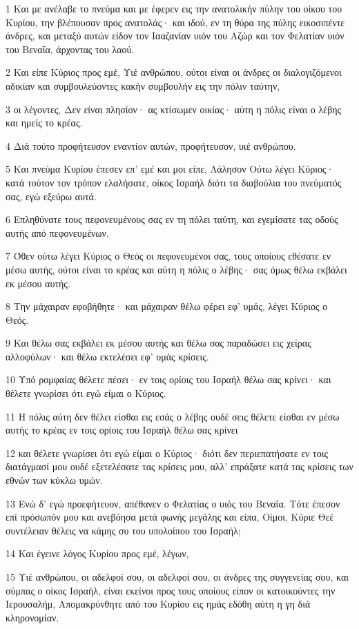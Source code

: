 \par 1 Και με ανέλαβε το πνεύμα και με έφερεν εις την ανατολικήν πύλην του οίκου του Κυρίου, την βλέπουσαν προς ανατολάς· και ιδού, εν τη θύρα της πύλης εικοσιπέντε άνδρες, και μεταξύ αυτών είδον τον Ιααζανίαν υιόν του Αζώρ και τον Φελατίαν υιόν του Βεναΐα, άρχοντας του λαού.
\par 2 Και είπε Κύριος προς εμέ, Υιέ ανθρώπου, ούτοι είναι οι άνδρες οι διαλογιζόμενοι αδικίαν και συμβουλεύοντες κακήν συμβουλήν εις την πόλιν ταύτην,
\par 3 οι λέγοντες, Δεν είναι πλησίον· ας κτίσωμεν οικίας· αύτη η πόλις είναι ο λέβης και ημείς το κρέας.
\par 4 Διά τούτο προφήτευσον εναντίον αυτών, προφήτευσον, υιέ ανθρώπου.
\par 5 Και πνεύμα Κυρίου έπεσεν επ' εμέ και μοι είπε, Λάλησον Ούτω λέγει Κύριος· κατά τούτον τον τρόπον ελαλήσατε, οίκος Ισραήλ διότι τα διαβούλια του πνεύματός σας, εγώ εξεύρω αυτά.
\par 6 Επληθύνατε τους πεφονευμένους σας εν τη πόλει ταύτη, και εγεμίσατε τας οδούς αυτής από πεφονευμένων.
\par 7 Όθεν ούτω λέγει Κύριος ο Θεός οι πεφονευμένοι σας, τους οποίους εθέσατε εν μέσω αυτής, ούτοι είναι το κρέας και αύτη η πόλις ο λέβης· σας όμως θέλω εκβάλει εκ μέσου αυτής.
\par 8 Την μάχαιραν εφοβήθητε· και μάχαιραν θέλω φέρει εφ' υμάς, λέγει Κύριος ο Θεός.
\par 9 Και θέλω σας εκβάλει εκ μέσου αυτής και θέλω σας παραδώσει εις χείρας αλλοφύλων· και θέλω εκτελέσει εφ' υμάς κρίσεις.
\par 10 Υπό ρομφαίας θέλετε πέσει· εν τοις ορίοις του Ισραήλ θέλω σας κρίνει· και θέλετε γνωρίσει ότι εγώ είμαι ο Κύριος.
\par 11 Η πόλις αύτη δεν θέλει είσθαι εις εσάς ο λέβης ουδέ σεις θέλετε είσθαι εν μέσω αυτής το κρέας εν τοις ορίοις του Ισραήλ θέλω σας κρίνει
\par 12 και θέλετε γνωρίσει ότι εγώ είμαι ο Κύριος· διότι δεν περιεπατήσατε εν τοις διατάγμασί μου ουδέ εξετελέσατε τας κρίσεις μου, αλλ' επράξατε κατά τας κρίσεις των εθνών των κύκλω υμών.
\par 13 Ενώ δ' εγώ προεφήτευον, απέθανεν ο Φελατίας ο υιός του Βεναΐα. Τότε έπεσον επί πρόσωπόν μου και ανεβόησα μετά φωνής μεγάλης και είπα, Οίμοι, Κύριε Θεέ συντέλειαν θέλεις να κάμης συ του υπολοίπου του Ισραήλ;
\par 14 Και έγεινε λόγος Κυρίου προς εμέ, λέγων,
\par 15 Υιέ ανθρώπου, οι αδελφοί σου, οι αδελφοί σου, οι άνδρες της συγγενείας σου, και σύμπας ο οίκος Ισραήλ, είναι εκείνοι προς τους οποίους είπον οι κατοικούντες την Ιερουσαλήμ, Απομακρύνθητε από του Κυρίου εις ημάς εδόθη αύτη η γη διά κληρονομίαν.
